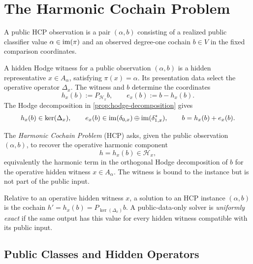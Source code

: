 \section{The Harmonic Cochain Problem}\label{sec:hcp-definition}

\begin{definition}\label{def:public-observation}
  A public HCP observation is a pair \((\alpha,b)\) consisting of a realized
  public classifier value \(\alpha\in\operatorname{im}(\pi)\) and an observed degree-one
  cochain \(b\in V\) in the fixed comparison coordinates.
\end{definition}

\begin{definition}\label{def:hidden-hodge-witness}
  A hidden Hodge witness for a public observation \((\alpha,b)\) is a hidden
  representative \(x\in A_\alpha\), satisfying \(\pi(x)=\alpha\). Its
  presentation data select the operative operator \(\Delta_x\). The witness
  and \(b\) determine the coordinates
  \[
    h_x(b):=P_{\mathcal H_x}b,
    \qquad
    e_x(b):=b-h_x(b).
  \]
  The Hodge decomposition in \cref{prop:hodge-decomposition} gives
  \[
    h_x(b)\in\ker(\Delta_x),\qquad
    e_x(b)\in
      \operatorname{im}(\delta_{0,x})\oplus\operatorname{im}(\delta_{1,x}^\ast),\qquad
    b=h_x(b)+e_x(b).
  \]
\end{definition}

\begin{definition}\label{def:hcp}
  The \emph{Harmonic Cochain Problem} (HCP) asks, given the public observation
  \((\alpha,b)\), to recover the operative harmonic component
  \[
    h=h_x(b)\in\mathcal H_x,
  \]
  equivalently the harmonic term in the orthogonal Hodge decomposition of
  \(b\) for the operative hidden witness \(x\in A_\alpha\). The witness is
  bound to the instance but is not part of the public input.
\end{definition}

\begin{definition}\label{def:hcp-solution}
  Relative to an operative hidden witness \(x\), a solution to an
  HCP instance \((\alpha,b)\) is the cochain
  \(h'=h_x(b)=P_{\ker(\Delta_x)}b\). A public-data-only solver is
  \emph{uniformly exact}
  if the same output has this value for every hidden witness compatible with
  its public input.
\end{definition}

\subsection{Public Classes and Hidden Operators}\label{sec:mathematical-framework}

